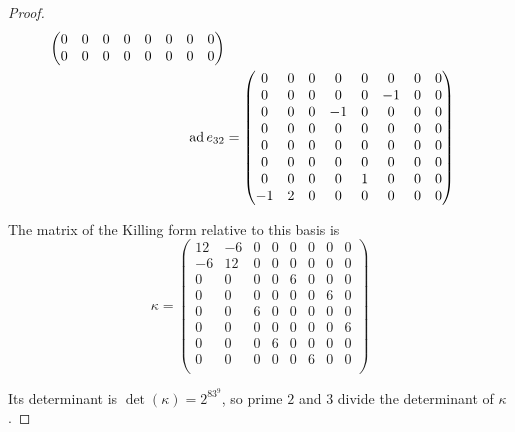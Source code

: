 \begin{proof}
\begin{align*}
\begin{pmatrix}
                    0 & 0 & 0 & 0 & 0 & 0 & 0 & 0 \\
                    0 & 0 & 0 & 0 & 0 & 0 & 0 & 0 \\
                  \end{pmatrix} \\
    \operatorname{ad} e_{32} & = \begin{pmatrix}
                     0 & 0 & 0 & 0 & 0 & 0 & 0 & 0 \\
                     0 & 0 & 0 & 0 & 0 & -1 & 0 & 0 \\
                     0 & 0 & 0 & -1 & 0 & 0 & 0 & 0 \\
                     0 & 0 & 0 & 0 & 0 & 0 & 0 & 0 \\
                     0 & 0 & 0 & 0 & 0 & 0 & 0 & 0 \\
                     0 & 0 & 0 & 0 & 0 & 0 & 0 & 0 \\
                     0 & 0 & 0 & 0 & 1 & 0 & 0 & 0 \\
                     -1 & 2 & 0 & 0 & 0 & 0 & 0 & 0 \\
                   \end{pmatrix}
  \end{align*}

  The matrix of the Killing form relative to this basis is
  \begin{equation*}
    \kappa=
    \begin{pmatrix}
      12 & -6 & 0 & 0 & 0 & 0 & 0 & 0 \\
      -6 & 12 & 0 & 0 & 0 & 0 & 0 & 0 \\
      0 & 0 & 0 & 0 & 6 & 0 & 0 & 0 \\
      0 & 0 & 0 & 0 & 0 & 0 & 6 & 0 \\
      0 & 0 & 6 & 0 & 0 & 0 & 0 & 0 \\
      0 & 0 & 0 & 0 & 0 & 0 & 0 & 6 \\
      0 & 0 & 0 & 6 & 0 & 0 & 0 & 0 \\
      0 & 0 & 0 & 0 & 0 & 6 & 0 & 0 \\
    \end{pmatrix}
  \end{equation*}

  Its determinant is $\det(\kappa) = 2^83^9$, so prime $2$ and $3$ divide the determinant of $\kappa$.
\end{proof}

